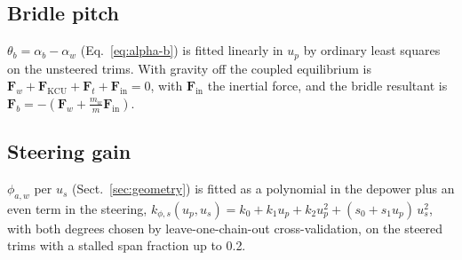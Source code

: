 \documentclass[11pt,a4paper]{article}
\begin{document}
\subsection{Bridle pitch}
$\theta_b=\alpha_b-\alpha_w$ (Eq.~\ref{eq:alpha-b}) is fitted linearly in $u_p$
by ordinary least squares on the unsteered trims. With gravity off the coupled
equilibrium is $\mathbf F_w+\mathbf F_\mathrm{KCU}+\mathbf F_t+\mathbf F_\mathrm{in}=0$,
with $\mathbf F_\mathrm{in}$ the inertial force, and the bridle resultant is
$\mathbf F_b=-(\mathbf F_w+\tfrac{m_w}{m}\mathbf F_\mathrm{in})$.

\subsection{Steering gain}
$\phi_{a,w}$ per $u_s$ (Sect.~\ref{sec:geometry}) is fitted as a polynomial in the
depower plus an even term in the steering,
$k_{\phi,s}(u_p,u_s)=k_0+k_1u_p+k_2u_p^2+(s_0+s_1u_p)\,u_s^2$, with both degrees chosen by leave-one-chain-out
cross-validation, on the steered trims with a stalled span fraction up to \num{0.2}.
\end{document}
